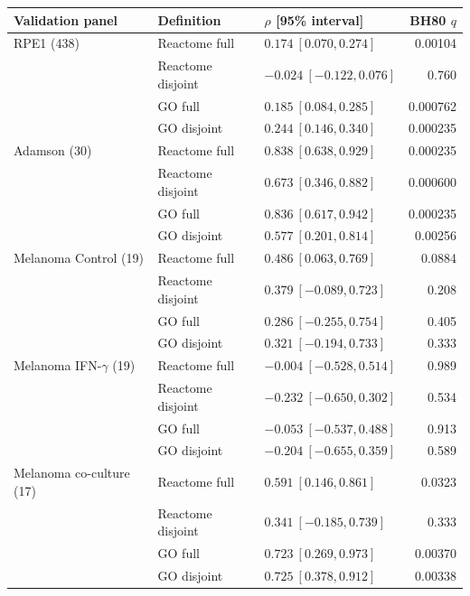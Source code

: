 \documentclass[a4paper,fleqn]{cas-sc}
\makeatletter
\DeclareRobustCommand{\rev}[1]{{\color{red}\def\@citecolor{black}\def\@linkcolor{red}\def\@urlcolor{red}#1}}
\makeatother
\begin{document}
\begingroup
\small
\begin{longtable}{p{}p{}p{}r}
\toprule
\rev{Validation panel} & \rev{Definition} & \rev{$\rho$ [95\% interval]} & \rev{BH80 $q$}\\
\midrule
\endhead
\rev{RPE1 (438)} & \rev{Reactome full} & \rev{$0.174\ [0.070,0.274]$} & \rev{0.00104}\\
\rev{} & \rev{Reactome disjoint} & \rev{$-0.024\ [-0.122,0.076]$} & \rev{0.760}\\
\rev{} & \rev{GO full} & \rev{$0.185\ [0.084,0.285]$} & \rev{0.000762}\\
\rev{} & \rev{GO disjoint} & \rev{$0.244\ [0.146,0.340]$} & \rev{0.000235}\\
\addlinespace
\rev{Adamson (30)} & \rev{Reactome full} & \rev{$0.838\ [0.638,0.929]$} & \rev{0.000235}\\
\rev{} & \rev{Reactome disjoint} & \rev{$0.673\ [0.346,0.882]$} & \rev{0.000600}\\
\rev{} & \rev{GO full} & \rev{$0.836\ [0.617,0.942]$} & \rev{0.000235}\\
\rev{} & \rev{GO disjoint} & \rev{$0.577\ [0.201,0.814]$} & \rev{0.00256}\\
\addlinespace
\rev{Melanoma Control (19)} & \rev{Reactome full} & \rev{$0.486\ [0.063,0.769]$} & \rev{0.0884}\\
\rev{} & \rev{Reactome disjoint} & \rev{$0.379\ [-0.089,0.723]$} & \rev{0.208}\\
\rev{} & \rev{GO full} & \rev{$0.286\ [-0.255,0.754]$} & \rev{0.405}\\
\rev{} & \rev{GO disjoint} & \rev{$0.321\ [-0.194,0.733]$} & \rev{0.333}\\
\addlinespace
\rev{Melanoma IFN-$\gamma$ (19)} & \rev{Reactome full} & \rev{$-0.004\ [-0.528,0.514]$} & \rev{0.989}\\
\rev{} & \rev{Reactome disjoint} & \rev{$-0.232\ [-0.650,0.302]$} & \rev{0.534}\\
\rev{} & \rev{GO full} & \rev{$-0.053\ [-0.537,0.488]$} & \rev{0.913}\\
\rev{} & \rev{GO disjoint} & \rev{$-0.204\ [-0.655,0.359]$} & \rev{0.589}\\
\addlinespace
\rev{Melanoma co-culture (17)} & \rev{Reactome full} & \rev{$0.591\ [0.146,0.861]$} & \rev{0.0323}\\
\rev{} & \rev{Reactome disjoint} & \rev{$0.341\ [-0.185,0.739]$} & \rev{0.333}\\
\rev{} & \rev{GO full} & \rev{$0.723\ [0.269,0.973]$} & \rev{0.00370}\\
\rev{} & \rev{GO disjoint} & \rev{$0.725\ [0.378,0.912]$} & \rev{0.00338}\\
\bottomrule
\end{longtable}
\endgroup
\end{document}
